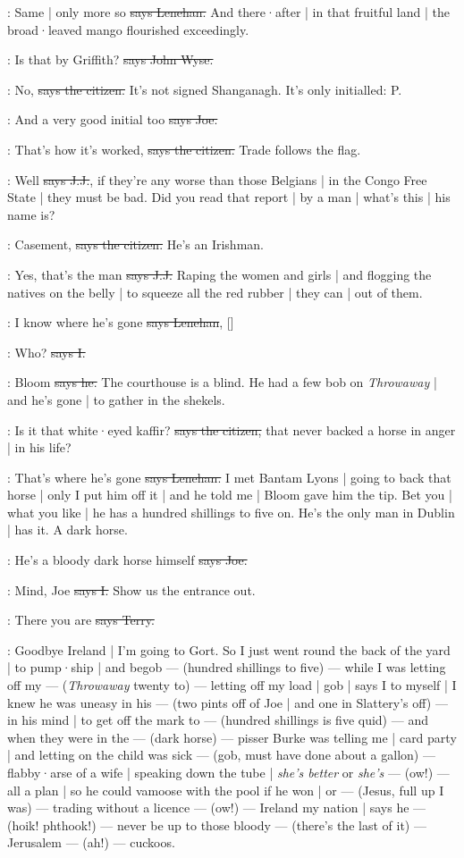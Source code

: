 \lenehan:
Same |
only more so
\sout{says Lenehan.}
And there·after |
in that fruitful land |
the broad·leaved mango flourished exceedingly.

\johnwyse:
Is that by Griffith?
\sout{says John Wyse.}

\citizen:
No,
\sout{says the citizen.}
It's not signed Shanganagh.
It's only initialled:
P.

\joe:
And a very good initial too
\sout{says Joe.}

\citizen:
That's how it's worked,
\sout{says the citizen.}
Trade follows the flag.

\jjom:
Well
\sout{says J.J.},
if they're any worse than those Belgians |
in the Congo Free State |
they must be bad.
Did you read that report |
by a man |
what's this |
his name is?

\citizen:
Casement,
\sout{says the citizen.}
He's an Irishman.

\jjom:
Yes,
that's the man
\sout{says J.J.}
Raping the women and girls |
and flogging the natives on the belly |
to squeeze all the red rubber |
they can |
out of them.

\lenehan:
I know where he's gone
\sout{says Lenehan},
[]

:
Who?
\sout{says I.}

\lenehan:
Bloom
\sout{says he.}
The courthouse is a blind.
He had a few bob on \emph{Throwaway} |
and he's gone |
to gather in the shekels.

\citizen:
Is it that white·eyed kaffir?
\sout{says the citizen,}
that never backed a horse in anger |
in his life?

\lenehan:
That's where he's gone
\sout{says Lenehan.}
I met Bantam Lyons |
going to back that horse |
only I put him off it |
and he told me |
Bloom gave him the tip.
Bet you |
what you like |
he has a hundred shillings to five on.
He's the only man in Dublin |
has it.
A dark horse.

\joe:
He's a bloody dark horse himself
\sout{says Joe.}

:
Mind,
Joe
\sout{says I.}
Show us the entrance out.

\terry:
There you are
\sout{says Terry.}

\Nq:
Goodbye Ireland |
I'm going to Gort.
So I just went round the back of the yard |
to pump·ship |
and begob
--- (hundred shillings to five) ---
while I was letting off my
--- (\emph{Throwaway} twenty to) ---
letting off my load |
gob |
says I to myself |
I knew he was uneasy in his
--- (two pints off of Joe |
and one in Slattery's off) ---
in his mind |
to get off the mark to
--- (hundred shillings is five quid) ---
and when they were in the
--- (dark horse) ---
pisser Burke
was telling me |
card party |
and letting on the child was sick
--- (gob,
must have done about a gallon) ---
flabby·arse of a wife |
speaking down the tube |
\emph{she's better} or \emph{she's}
--- (ow!) ---
all a plan |
so he could vamoose with the pool if he won |
or
--- (Jesus,
full up I was) ---
trading without a licence
--- (ow!) ---
Ireland my nation |
says he
--- (hoik!
phthook!) ---
never be up to those bloody
--- (there's the last of it) ---
Jerusalem
--- (ah!) ---
cuckoos.


